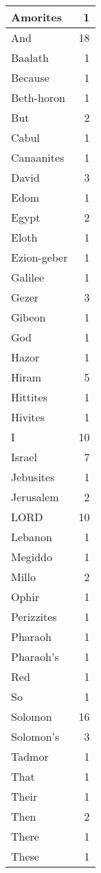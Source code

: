 \begin{center}
\begin{longtable}{l|r}
\hline \hline
\endlastfoot
Amorites & 1 \\ \hline
And & 18 \\ \hline
Baalath & 1 \\ \hline
Because & 1 \\ \hline
Beth-horon & 1 \\ \hline
But & 2 \\ \hline
Cabul & 1 \\ \hline
Canaanites & 1 \\ \hline
David & 3 \\ \hline
Edom & 1 \\ \hline
Egypt & 2 \\ \hline
Eloth & 1 \\ \hline
Ezion-geber & 1 \\ \hline
Galilee & 1 \\ \hline
Gezer & 3 \\ \hline
Gibeon & 1 \\ \hline
God & 1 \\ \hline
Hazor & 1 \\ \hline
Hiram & 5 \\ \hline
Hittites & 1 \\ \hline
Hivites & 1 \\ \hline
I & 10 \\ \hline
Israel & 7 \\ \hline
Jebusites & 1 \\ \hline
Jerusalem & 2 \\ \hline
LORD & 10 \\ \hline
Lebanon & 1 \\ \hline
Megiddo & 1 \\ \hline
Millo & 2 \\ \hline
Ophir & 1 \\ \hline
Perizzites & 1 \\ \hline
Pharaoh & 1 \\ \hline
Pharaoh's & 1 \\ \hline
Red & 1 \\ \hline
So & 1 \\ \hline
Solomon & 16 \\ \hline
Solomon's & 3 \\ \hline
Tadmor & 1 \\ \hline
That & 1 \\ \hline
Their & 1 \\ \hline
Then & 2 \\ \hline
There & 1 \\ \hline
These & 1 \\ \hline

\end{longtable}
\end{center}
